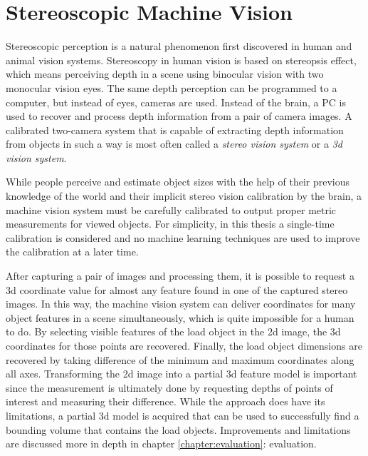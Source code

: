 \documentclass[12pt,a4paper,oneside,pdftex]{report}
\begin{document}
{%
\chapter{Stereoscopic Machine Vision}
\label{chapter:stereographic_machine_vision}
Stereoscopic perception is a natural phenomenon first discovered in human and animal vision systems. Stereoscopy in human vision is based on stereopsis effect, which means perceiving depth in a scene using binocular vision with two monocular vision eyes. The same depth perception can be programmed to a computer, but instead of eyes, cameras are used. Instead of the brain, a PC is used to recover and process depth information from a pair of camera images. A calibrated two-camera system that is capable of extracting depth information from objects in such a way is most often called a \emph{stereo vision system} or a \emph{3d vision system}.

While people perceive and estimate object sizes with the help of their previous knowledge of the world and their implicit stereo vision calibration by the brain, a machine vision system must be carefully calibrated to output proper metric measurements for viewed objects. For simplicity, in this thesis a single-time calibration is considered and no machine learning techniques are used to improve the calibration at a later time.

After capturing a pair of images and processing them, it is possible to request a 3d coordinate value for almost any feature found in one of the captured stereo images. In this way, the machine vision system can deliver coordinates for many object features in a scene simultaneously, which is quite impossible for a human to do. By selecting visible features of the load object in the 2d image, the 3d coordinates for those points are recovered. Finally, the load object dimensions are recovered by taking difference of the minimum and maximum coordinates along all axes. Transforming the 2d image into a partial 3d feature model is important since the measurement is ultimately done by requesting depths of points of interest and measuring their difference. While the approach does have its limitations, a partial 3d model is acquired that can be used to successfully find a bounding volume that contains the load objects. Improvements and limitations are discussed more in depth in chapter \ref{chapter:evaluation}: evaluation.

}
\end{document}
